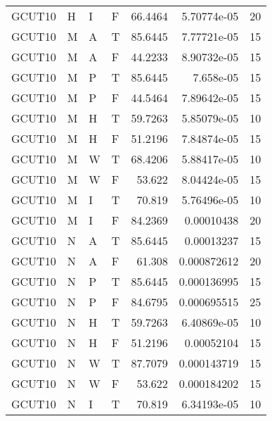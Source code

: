 \begin{longtable}{llllrrr}
    GCUT10   & H         & I         & F          & 66.4464    & 5.70774e-05 & 20       \\
    GCUT10   & M         & A         & T          & 85.6445    & 7.77721e-05 & 15       \\
    GCUT10   & M         & A         & F          & 44.2233    & 8.90732e-05 & 15       \\
    GCUT10   & M         & P         & T          & 85.6445    & 7.658e-05   & 15       \\
    GCUT10   & M         & P         & F          & 44.5464    & 7.89642e-05 & 15       \\
    GCUT10   & M         & H         & T          & 59.7263    & 5.85079e-05 & 10       \\
    GCUT10   & M         & H         & F          & 51.2196    & 7.84874e-05 & 15       \\
    GCUT10   & M         & W         & T          & 68.4206    & 5.88417e-05 & 10       \\
    GCUT10   & M         & W         & F          & 53.622     & 8.04424e-05 & 15       \\
    GCUT10   & M         & I         & T          & 70.819     & 5.76496e-05 & 10       \\
    GCUT10   & M         & I         & F          & 84.2369    & 0.00010438  & 20       \\
    GCUT10   & N         & A         & T          & 85.6445    & 0.00013237  & 15       \\
    GCUT10   & N         & A         & F          & 61.308     & 0.000872612 & 20       \\
    GCUT10   & N         & P         & T          & 85.6445    & 0.000136995 & 15       \\
    GCUT10   & N         & P         & F          & 84.6795    & 0.000695515 & 25       \\
    GCUT10   & N         & H         & T          & 59.7263    & 6.40869e-05 & 10       \\
    GCUT10   & N         & H         & F          & 51.2196    & 0.00052104  & 15       \\
    GCUT10   & N         & W         & T          & 87.7079    & 0.000143719 & 15       \\
    GCUT10   & N         & W         & F          & 53.622     & 0.000184202 & 15       \\
    GCUT10   & N         & I         & T          & 70.819     & 6.34193e-05 & 10       \\

\end{longtable}
